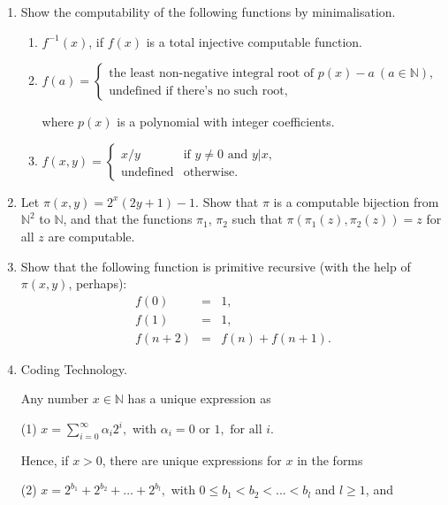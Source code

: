\documentclass[12pt,a4paper]{article}
\theoremstyle{definition}
\numberwithin{equation}{section}
\numberwithin{figure}{section}
\begin{document}
\begin{enumerate}
  \item Show the computability of the following functions by minimalisation.
    \begin{enumerate}
    \item $f^{-1}(x)$, if $f(x)$ is a total injective computable function.
    \item $f(a)=\left\{\begin{array}{l}
                       \mbox{the least non-negative integral root of } p(x)-a\ (a\in \mathbb{N}),\\
                       \mbox{undefined if there's no such root},
                       \end{array}\right.$  \vspace{1mm}

                       where $p(x)$ is a polynomial with integer coefficients.
    \item $f(x,y)=\left\{\begin{array}{ll}
        x/y & \mbox{if } y\neq 0 \mbox{ and } y|x,\\
        \mbox{undefined} & \mbox{otherwise}.
        \end{array}\right.$
    \end{enumerate}


\item Let $\pi (x,y)=2^{x}(2y+1)-1$. Show that $\pi$ is a computable bijection from $\mathbb{N}^{2}$ to $\mathbb{N}$, and that the functions $\pi_{1}$, $\pi_{2}$ such that $\pi(\pi_{1}(z),\pi_{2}(z))=z$ for all $z$ are computable.


\item Show that the following function is primitive recursive (with the help of $\pi(x,y)$, perhaps):
\begin{eqnarray*}
  f(0) & = & 1, \\
  f(1) & = & 1, \\
  f(n+2) & = & f(n) + f(n+1).
\end{eqnarray*}
  \item Coding Technology.

  Any number $x \in \mathbb{N}$ has a unique expression as

  (1) $x=\sum\limits_{i=0}^{\infty} \alpha_{i}2^{i},$ with $\alpha_{i}=0 \mbox{ or } 1,\mbox{ for all }i.$

  Hence, if $x>0$, there are unique expressions for  $x$ in the forms

  (2) $x=2^{b_{1}}+2^{b_{2}}+\ldots+2^{b_{l}},$ with $0\leq b_{1}<b_{2}<...<b_{l}$ and $l \geq 1$, and


\end{enumerate}
\end{document}
